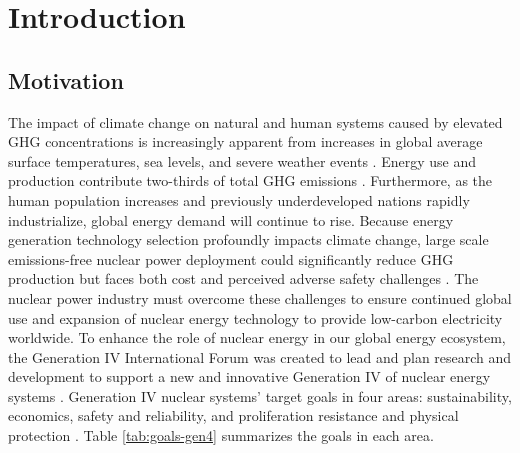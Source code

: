 \chapter{Introduction}
\label{chap:intro}


\section{Motivation}
The impact of climate change on natural and human systems caused by 
elevated \gls{GHG} concentrations is increasingly apparent from increases 
in global average surface temperatures, sea levels, and severe weather events 
\cite{noauthor_climate_2018}.
Energy use and production contribute two-thirds of total \gls{GHG}
emissions \cite{noauthor_climate_2018}.
Furthermore, as the human population increases and previously underdeveloped 
nations rapidly industrialize, global energy demand will continue to rise.  
Because energy generation technology selection profoundly impacts climate change, 
large scale emissions-free nuclear power deployment could 
significantly reduce GHG production but faces both cost and perceived adverse 
safety challenges \cite{noauthor_climate_2018, petti_future_2018}. 
The nuclear power industry must overcome these challenges to ensure continued 
global use and expansion of nuclear energy technology to provide low-carbon 
electricity worldwide.
To enhance the role of nuclear energy in our global energy 
ecosystem, the Generation IV International Forum was created to lead and plan 
research and development to support a new and innovative Generation IV of
nuclear energy systems \cite{gif_technology_2002}.
Generation IV nuclear systems' target goals in four areas: sustainability, 
economics, safety and reliability, and proliferation resistance and physical 
protection \cite{gif_technology_2002}. 
Table \ref{tab:goals-gen4} summarizes the goals in each area. 

